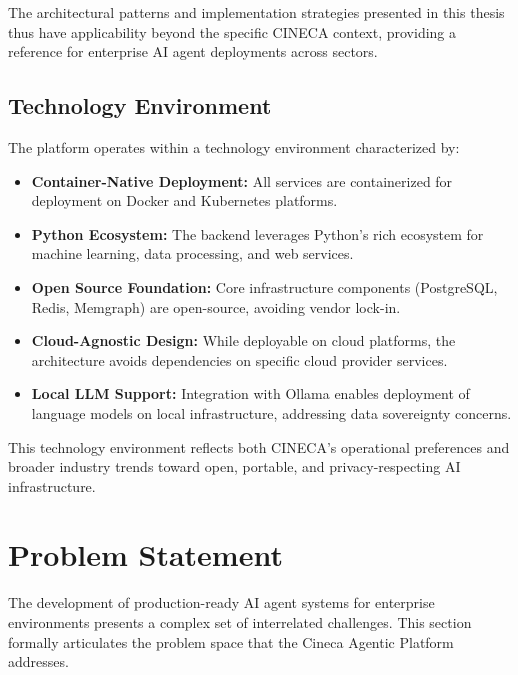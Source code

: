 \documentclass[a4paper,twoside]{sapthesis}
\begin{document}
The architectural patterns and implementation strategies presented in this thesis thus have applicability beyond the specific CINECA context, providing a reference for enterprise AI agent deployments across sectors.

\subsection{Technology Environment}

The platform operates within a technology environment characterized by:

\begin{itemize}
    \item \textbf{Container-Native Deployment:} All services are containerized for deployment on Docker and Kubernetes platforms.
    
    \item \textbf{Python Ecosystem:} The backend leverages Python's rich ecosystem for machine learning, data processing, and web services.
    
    \item \textbf{Open Source Foundation:} Core infrastructure components (PostgreSQL, Redis, Memgraph) are open-source, avoiding vendor lock-in.
    
    \item \textbf{Cloud-Agnostic Design:} While deployable on cloud platforms, the architecture avoids dependencies on specific cloud provider services.
    
    \item \textbf{Local LLM Support:} Integration with Ollama enables deployment of language models on local infrastructure, addressing data sovereignty concerns.
\end{itemize}

This technology environment reflects both CINECA's operational preferences and broader industry trends toward open, portable, and privacy-respecting AI infrastructure.

\section{Problem Statement}
\label{sec:problem-statement}

The development of production-ready AI agent systems for enterprise environments presents a complex set of interrelated challenges. This section formally articulates the problem space that the Cineca Agentic Platform addresses.
\end{document}
